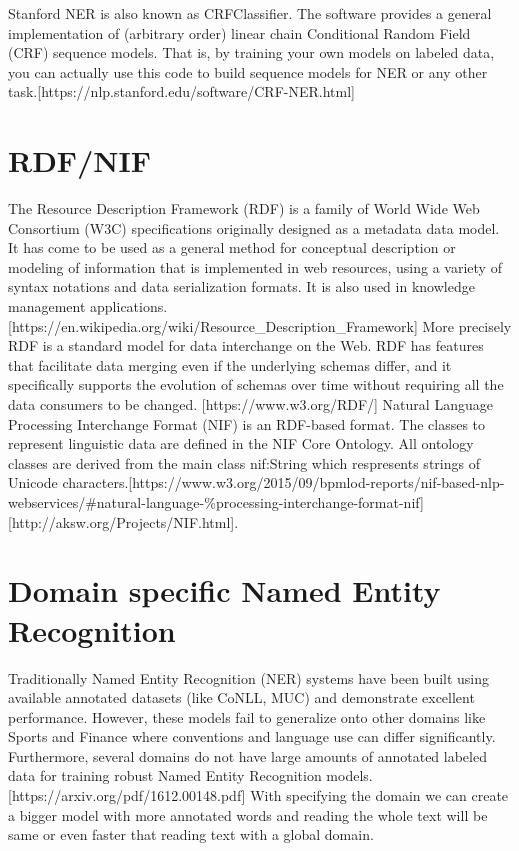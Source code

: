 \documentclass[thesis=M,english]{FITthesis}[2018/05/30]
\begin{document}
Stanford NER is also known as CRFClassifier. The software provides a general implementation of (arbitrary order) linear chain Conditional Random Field (CRF) sequence models. That is, by training your own models on labeled data, you can actually use this code to build sequence models for NER or any other task.[https://nlp.stanford.edu/software/CRF-NER.html]

\section{RDF/NIF}
The Resource Description Framework (RDF) is a family of World Wide Web Consortium (W3C) specifications originally designed as a metadata data model. It has come to be used as a general method for conceptual description or modeling of information that is implemented in web resources, using a variety of syntax notations and data serialization formats. It is also used in knowledge management applications. [https://en.wikipedia.org/wiki/Resource\_Description\_Framework]
\linebreak More precisely RDF is a standard model for data interchange on the Web. RDF has features that facilitate data merging even if the underlying schemas differ, and it specifically supports the evolution of schemas over time without requiring all the data consumers to be changed. [https://www.w3.org/RDF/]
\linebreak Natural Language Processing Interchange Format (NIF) is an RDF-based format. The classes to represent linguistic data are defined in the NIF Core Ontology. All ontology classes are derived from the main class nif:String which respresents strings of Unicode characters.[https://www.w3.org/2015/09/bpmlod-reports/nif-based-nlp-webservices/\#natural-language-\%processing-interchange-format-nif] [http://aksw.org/Projects/NIF.html]. 

\section{Domain specific Named Entity Recognition}
Traditionally Named Entity Recognition (NER) systems have been built using available annotated datasets (like CoNLL, MUC) and demonstrate excellent performance. However, these models fail to generalize onto other domains like Sports and Finance where conventions and language use can differ significantly. Furthermore, several domains do not have large amounts of annotated labeled data for training robust Named Entity Recognition models. [https://arxiv.org/pdf/1612.00148.pdf]
With specifying the domain we can create a bigger model with more annotated words and reading the whole text will be same or even faster that reading text with a global domain.  
\end{document}
